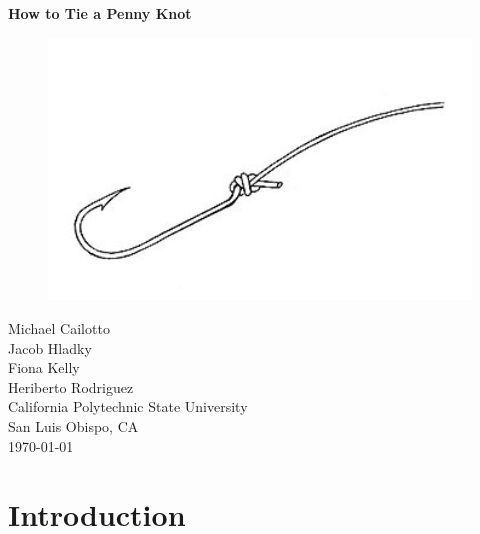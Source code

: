 \documentclass[12pt]{article}
\begin{document}
\begin{titlepage}
  \begin{center}
    \vspace*{1cm}
    \huge\textbf{How to Tie a Penny Knot}

    \vspace{1.5cm}

    \begin{figure}[ht!]
      \centering
      \includegraphics[width=1\textwidth]{title_pic.png}
      \label{fig:title_pic}
    \end{figure}

    \vfill
    \large{
      Michael Cailotto\\
      Jacob Hladky\\
      Fiona Kelly\\
      Heriberto Rodriguez\\
      \bigskip
      California Polytechnic State University\\
      San Luis Obispo, CA\\
      \today
    }

  \end{center}
\end{titlepage}


\tableofcontents

\listoffigures
\begingroup
\let\clearpage\relax
\listoftables
\endgroup
\clearpage


\section{Introduction}
\end{document}
